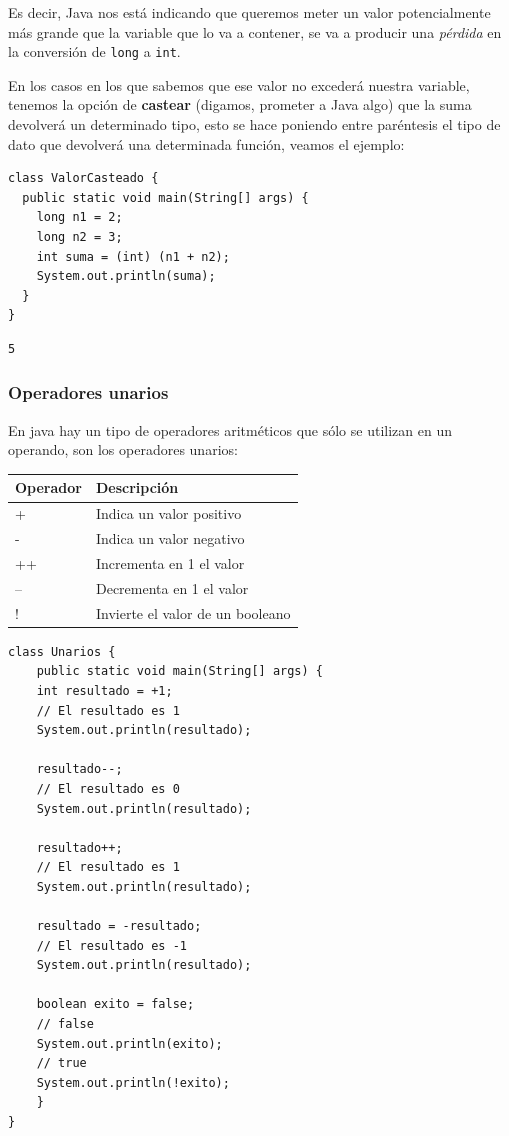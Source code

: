\documentclass[11pt]{article}
\begin{document}
Es decir, Java nos está indicando que queremos meter un valor potencialmente más grande que la variable que lo va a contener, se va a producir una \emph{pérdida} en la conversión de \texttt{long} a \texttt{int}.

En los casos en los que sabemos que ese valor no excederá nuestra variable, tenemos la opción de \textbf{castear} (digamos, prometer a Java algo) que la suma devolverá un determinado tipo, esto se hace poniendo entre paréntesis el tipo de dato que devolverá una determinada función, veamos el ejemplo:

\begin{verbatim}
class ValorCasteado {
  public static void main(String[] args) {
    long n1 = 2;
    long n2 = 3;
    int suma = (int) (n1 + n2);
    System.out.println(suma);
  }
}
\end{verbatim}

\begin{verbatim}
5
\end{verbatim}

\subsubsection{Operadores unarios}
\label{sec:org7b22e5a}
En java hay un tipo de operadores aritméticos que sólo se utilizan en un operando, son los operadores unarios:
\begin{center}
\begin{tabular}{ll}
Operador & Descripción\\
\hline
+ & Indica un valor positivo\\
- & Indica un valor negativo\\
++ & Incrementa en 1 el valor\\
-- & Decrementa en 1 el valor\\
! & Invierte el valor de un booleano\\
\end{tabular}
\end{center}

\begin{verbatim}
class Unarios {
    public static void main(String[] args) {
	int resultado = +1;
	// El resultado es 1
	System.out.println(resultado);

	resultado--;
	// El resultado es 0
	System.out.println(resultado);

	resultado++;
	// El resultado es 1
	System.out.println(resultado);

	resultado = -resultado;
	// El resultado es -1
	System.out.println(resultado);

	boolean exito = false;
	// false
	System.out.println(exito);
	// true
	System.out.println(!exito);
    }
}
\end{verbatim}
\end{document}
